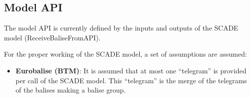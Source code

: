 \subsection{Model API}

The model API is currently defined by the inputs and outputs of the SCADE model (ReceiveBaliseFromAPI).

For the proper working of the SCADE model, a set of assumptions are assumed:
\begin{itemize}
\item \textbf{Eurobalise (BTM)}: It is assumed that at most one
``telegram'' is provided per call of the SCADE model. This
``telegram'' is the merge of the telegrams of the balises making a
balise group.
\end{itemize}

